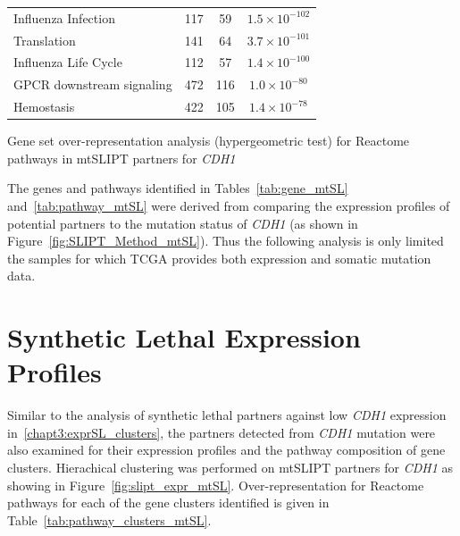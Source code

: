 \begin{table}[!ht]
{\begin{threeparttable}
\begin{tabular}{lccc}
  \rowcolor{black!5}
  Influenza Infection & 117 &  59 & $1.5 \times 10^{-102}$ \\ 
  \rowcolor{black!10}
  Translation & 141 &  64 & $3.7 \times 10^{-101}$ \\ 
  \rowcolor{black!5}
  Influenza Life Cycle & 112 &  57 & $1.4 \times 10^{-100}$ \\ 
  \rowcolor{black!10}
  GPCR downstream signaling & 472 & 116 & $1.0 \times 10^{-80}$ \\ 
  \rowcolor{black!5}
  Hemostasis & 422 & 105 & $1.4 \times 10^{-78}$ \\ 
  \hline
\end{tabular}
\begin{tablenotes}
\raggedright \small
Gene set over-representation analysis (hypergeometric test) for Reactome pathways in mtSLIPT partners for \textit{CDH1}
\end{tablenotes}
\end{threeparttable}
}
\end{table}

\FloatBarrier

The genes and pathways identified in Tables~\ref{tab:gene_mtSL} and~\ref{tab:pathway_mtSL} were derived from comparing the expression profiles of potential partners to the mutation status of \textit{CDH1} (as shown in Figure~\ref{fig:SLIPT_Method_mtSL}). Thus the following analysis is only limited the samples for which TCGA provides both expression and somatic mutation data.

\FloatBarrier

\section{Synthetic Lethal Expression Profiles} \label{appendix:mtSL_clusters}

Similar to the analysis of synthetic lethal partners against low \textit{CDH1} expression in~\ref{chapt3:exprSL_clusters}, the partners detected from \textit{CDH1} mutation were also examined for their expression profiles and the pathway composition of gene clusters. Hierachical clustering was performed on mtSLIPT partners for \textit{CDH1} as showing in Figure~\ref{fig:slipt_expr_mtSL}. Over-representation for Reactome pathways for each of the gene clusters identified is given in Table~\ref{tab:pathway_clusters_mtSL}.

